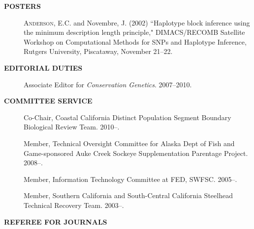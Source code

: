 \documentclass[11pt]{article}
\newlength{\postskip}
\newlength{\preskip}
\begin{document}
{\bf POSTERS}
\begin{description}
\item[] \textsc{Anderson, E.C.} and Novembre, J. (2002) ``Haplotype block inference using the minimum
description length principle," DIMACS/RECOMB Satellite Workshop on Computational Methods for SNPs and 
Haplotype Inference, Rutgers University, Piscataway, November 21--22.
\end{description}



\vspace*{\postskip}

{\bf EDITORIAL DUTIES}
\vspace*{\preskip}
\begin{description}
\item[] Associate Editor for {\em Conservation Genetics}. 2007--2010.
\end{description}
\vspace*{\postskip}


{\bf COMMITTEE SERVICE}
\begin{description}
\item[] Co-Chair, Coastal California Distinct Population Segment Boundary Biological Review Team. 2010--.
\item[] Member, Technical Oversight Committee for Alaska Dept of Fish and Game-sponsored Auke Creek Sockeye Supplementation Parentage Project. 2008--.
\item[] Member, Information Technology Committee at FED, SWFSC. 2005--.
\item[] Member, Southern California and South-Central California Steelhead Technical Recovery Team. 2003--.
\end{description}
\vspace*{\postskip}

{\bf REFEREE FOR JOURNALS}
\vspace*{\preskip}
\end{document}
